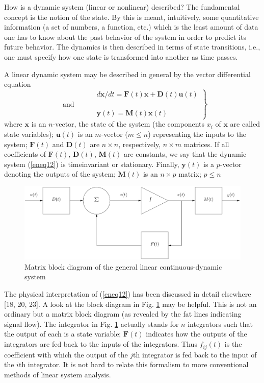 \documentclass{article}
\newcommand{\vect}[1]{\mathbf{#1}}
\begin{document}
How is a dynamic system (linear or nonlinear) described? The fundamental concept is the notion of the state. By this is meant, intuitively, some quantitative information (a set of numbers, a function, etc.) which is the least amount of data one has to know about the past behavior of the system in order to predict its future behavior. The dynamics is then described in terms of state transitions, i.e., one must specify how one state is transformed into another as time passes.

A linear dynamic system may be described in general by the vector differential equation
\begin{equation}
\label{eneq12}
\left.\begin{aligned}
&d\mathbf{x}/dt=\mathbf{F}(t)\mathbf{x}+\mathbf{D}(t)\mathbf{u}(t)\\
\text{ and }\qquad&\\
&\mathbf{y}(t)=\mathbf{M}(t)\mathbf{x}(t)
\end{aligned}\right\}
\end{equation}
where $\vect{x}$ is an $n$-vector, the state of the system (the components $x_i$ of $\vect{x}$ are called state variables); $\vect{u}(t)$ is an $m$-vector ($m \le n$) representing the inputs to the system; $\vect{F}(t)$ and $\vect{D}(t)$ are $n \times n$, respectively, $n \times m$ matrices. If all coefficients of $\vect{F}(t)$, $\vect{D}(t)$, $\vect{M}(t)$ are constants, we say that the dynamic system (\ref{eneq12}) is timeinvariant or stationary. Finally, $\vect{y}(t)$ is a $p$-vector denoting the outputs of the system; $\vect{M}(t)$ is an $n \times p$ matrix; $p \le n$
\begin{figure}[htbp]
\centering
\includegraphics[width=0.5\paperwidth]{fig/fg1.pdf}
\caption{Matrix block diagram of the general linear continuous-dynamic system}
\label{enfg1}
\end{figure}

The physical interpretation of (\ref{eneq12}) has been discussed in detail elsewhere [18, 20, 23]. A look at the block diagram in Fig. \ref{enfg1} may be helpful. This is not an ordinary but a matrix block diagram (as revealed by the fat lines indicating signal flow). The integrator in Fig. \ref{enfg1} actually stands for $n$ integrators such that the output of each is a state variable; $\vect{F}(t)$ indicates how the outputs of the integrators are fed back to the inputs of the integrators. Thus $f_{ij}(t)$ is the coefficient with which the output of the $j$th integrator is fed back to the input of the $i$th integrator. It is not hard to relate this formalism to more conventional methods of linear system analysis.
\end{document}
